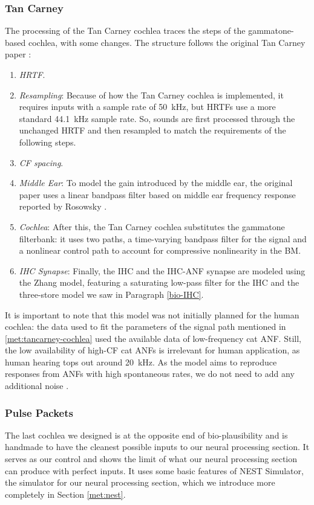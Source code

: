 \documentclass[11pt,a4paper]{article}
\begin{document}
\subsubsection{Tan Carney}
The processing of the Tan Carney cochlea traces the steps of the gammatone-based cochlea, with some changes. The structure follows the original Tan Carney paper \cite{tanPhenomenologicalModelResponses2003}:
\begin{enumerate}
    \item \textit{HRTF}.
    \item \textit{Resampling}: Because of how the Tan Carney cochlea is implemented, it requires inputs with a sample rate of \qty{50}{\kilo\hertz}, but HRTFs use a more standard \qty{44.1}{\kilo\hertz} sample rate. So, sounds are first processed through the unchanged HRTF and then resampled to match the requirements of the following steps.
    \item \textit{CF spacing}.
    \item \textit{Middle Ear}: To model the gain introduced by the middle ear, the original paper uses a linear bandpass filter based on middle ear frequency response reported by Rosowsky \cite{rosowskiModelsExternalMiddleEar1996}.
    \item\label{met:tancarney-cochlea} \textit{Cochlea}: After this, the Tan Carney cochlea substitutes the gammatone filterbank: it uses two paths, a time-varying bandpass filter for the signal and a nonlinear control path to account for compressive nonlinearity in the BM.
    \item \textit{IHC Synapse}: Finally, the IHC and the IHC-ANF synapse are modeled using the Zhang \cite{zhangPhenomenologicalModelResponses2001} model, featuring a saturating low-pass filter for the IHC and the three-store model we saw in Paragraph \ref{bio-IHC}.
\end{enumerate}

It is important to note that this model was not initially planned for the human cochlea: the data used to fit the parameters of the signal path mentioned in \ref{met:tancarney-cochlea} used the available data of low-frequency cat ANF. Still, the low availability of high-CF cat ANFs is irrelevant for human application, as human hearing tops out around \qty{20}{\kilo\hertz}. As the model aims to reproduce responses from ANFs with high spontaneous rates, we do not need to add any additional noise \cite{tanPhenomenologicalModelResponses2003}.

\subsubsection{Pulse Packets}\label{sec:pulsepacket}
The last cochlea we designed is at the opposite end of bio-plausibility and is handmade to have the cleanest possible inputs to our neural processing section. It serves as our control and shows the limit of what our neural processing section can produce with perfect inputs. It uses some basic features of NEST Simulator, the simulator for our neural processing section, which we introduce more completely in Section \ref{met:nest}. 
\end{document}
